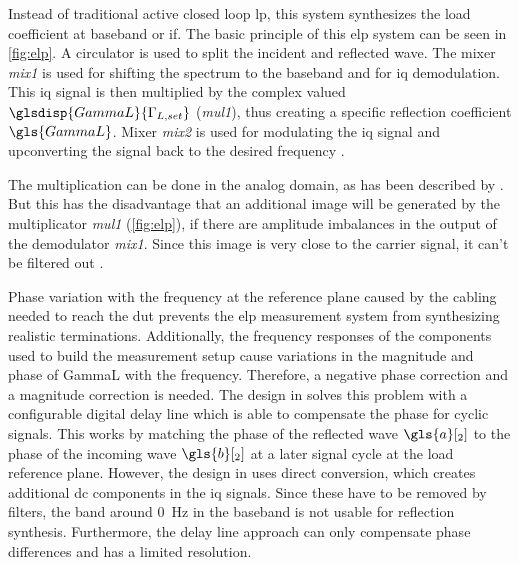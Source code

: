 \documentclass[12pt,a4paper,parskip=full,abstract=true,BCOR=12mm]{scrreprt}
\def\device#1{\mbox{\textit{#1}}}
\begin{document}
Instead of traditional active closed loop \gls{lp}, this system synthesizes the
load coefficient at baseband or \gls{if}. The basic principle of this \gls{elp} system
can be seen in \cref{fig:elp}. A circulator is used to split the incident and
reflected wave. The mixer \device{mix1} is used for shifting the spectrum to
the baseband and for \gls{iq} demodulation. This \gls{iq} signal is then
multiplied by the complex valued $\glsdisp{GammaL}{\Gamma_{L,set}}$ (\device{mul1}), thus creating a specific
reflection coefficient $\gls{GammaL}$. Mixer \device{mix2} is used for modulating
the \gls{iq} signal and upconverting the signal back to the desired frequency \cite{williams_experimental_2005}.

The multiplication can be done in the analog domain, as has been described
by \cite{williams_experimental_2005}. But this has the disadvantage that
an additional image will be generated by the multiplicator \device{mul1} (\cref{fig:elp}),
if there are amplitude imbalances in the output
of the demodulator \device{mix1}. Since this image is very close to the
carrier signal, it can't be filtered out \cite{hashmi_agile_2010}.

Phase variation with the frequency at the reference plane caused by the
cabling needed to reach the \gls{dut} prevents the \gls{elp} measurement
system from synthesizing realistic terminations. Additionally, the frequency
responses of the components used to build the measurement setup cause variations
in the magnitude and phase of \gls{GammaL} with the frequency. Therefore, a negative
phase correction and a magnitude correction is needed. The design in \cite{hashim_active_2008} solves
this problem with a configurable digital delay line which is able to compensate
the phase for cyclic signals. This works by matching the
phase of the reflected wave $\gls{a}[_2]$ to the phase of the incoming wave
$\gls{b}[_2]$ at a later signal cycle at the load reference plane. However, the design in
\cite{hashim_active_2008} uses direct conversion, which creates additional
\gls{dc} components in the \gls{iq} signals. Since these have to be removed
by filters, the band around \SI{0}{\hertz} in the baseband is not usable for reflection
synthesis. Furthermore, the delay line approach can only compensate
phase differences and has a limited resolution.
\end{document}

